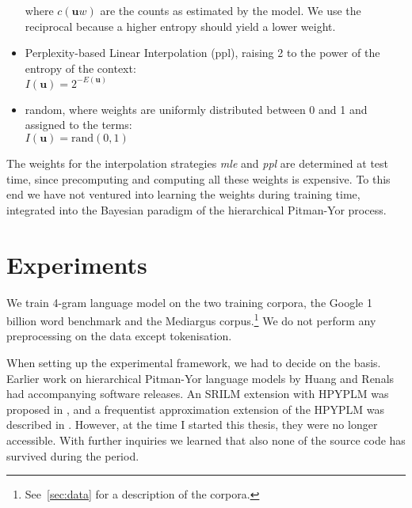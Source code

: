\begin{itemize}
    where $c(\mathbf{u}w)$ are the counts as estimated by the model. We use the reciprocal because a higher entropy should yield a lower weight.
\item \textsf{Perplexity-based Linear Interpolation (ppl)}, raising 2 to the power of the entropy of the context: \\ %
	$\textstyle I(\mathbf{u}) = \displaystyle 2^{-E(\mathbf{u})} $
    \item \textsf{random}, where weights are uniformly distributed between 0 and 1 and assigned to the terms: \\
    $ I(\mathbf{u}) = \text{rand}(0,1) $
  \end{itemize} 

The weights for the interpolation strategies \textsl{mle} and \textsl{ppl} are determined at test time, since precomputing and computing all these weights is expensive. To this end we have not ventured into learning the weights during training time, integrated into the Bayesian paradigm of the hierarchical Pitman-Yor process.

\section{Experiments}
We train 4-gram language model on the two training corpora, the Google 1 billion word benchmark and the Mediargus corpus.\footnote{See~\ref{sec:data} for a description of the corpora.} We do not perform any preprocessing on the data except tokenisation. 

When setting up the experimental framework, we had to decide on the basis. Earlier work on hierarchical Pitman-Yor language models by Huang and Renals had accompanying software releases. An SRILM extension with HPYPLM was proposed in \cite{huang2007hierarchical}, and a frequentist approximation extension of the HPYPLM was described in \cite{huang2010power}. However, at the time I started this thesis, they were no longer accessible. With further inquiries we learned that also none of the source code has survived during the period. 

